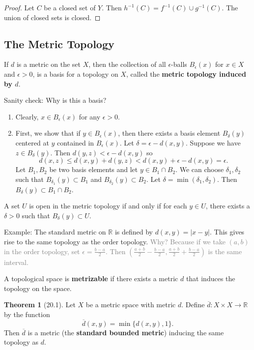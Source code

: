 \documentclass{article}
\newcommand{\nline}{\vspace*{0.5\baselineskip}}
\newcommand{\com}[1]{\textcolor{grey}{#1}}
\theoremstyle{definition}
\newtheorem{theorem}{Theorem}[subsection]
\begin{document}
\begin{flushleft}
\begin{proof}
Let $C$ be a closed set of $Y$. Then $h^{-1}(C) = f^{-1}(C) \cup g^{-1}(C)$. The union of closed sets is closed.
\end{proof}

\subsection{The Metric Topology}

If $d$ is a metric on the set $X$, then the collection of all $\epsilon$-balls $B_\epsilon(x)$ for $x \in X$ and $\epsilon > 0$, is a basis for a topology on $X$, called the \textbf{metric topology induced by $d$}.

\nline

Sanity check: Why is this a basis?

\begin{enumerate}
    \item Clearly, $x \in B_\epsilon(x)$ for any $\epsilon > 0$.
    \item First, we show that if $y \in B_\epsilon(x)$, then there exists a basis element $B_\delta(y)$ centered at $y$ contained in $B_\epsilon(x)$. Let $\delta = \epsilon - d(x,y)$. Suppose we have $z \in B_\delta(y)$. Then $d(y,z) < \epsilon - d(x,y)$ so
    \[
    d(x,z) \leq d(x,y) + d(y,z) < d(x,y) + \epsilon - d(x,y) = \epsilon.
    \]
    Let $B_1, B_2$ be two basis elements and let $y \in B_1 \cap B_2$. We can choose $\delta_1,\delta_2$ such that $B_{\delta_1}(y) \subset B_1$ and $B_{\delta_2}(y) \subset B_2$. Let $\delta = \min(\delta_1,\delta_2)$. Then $B_\delta(y) \subset B_1 \cap B_2$.
\end{enumerate}

A set $U$ is open in the metric topology if and only if for each $y \in U$, there exists a $\delta > 0$ such that $B_\delta(y) \subset U$.

Example: The standard metric on $\mathbb{R}$ is defined by $d(x,y) = |x - y|$. This gives rise to the same topology as the order topology. \com{Why? Because if we take $(a,b)$ in the order topology, set $\epsilon = \frac{b-a}{2}$. Then $(\frac{a+b}{2} - \frac{b - a}{2}, \frac{a+b}{2} + \frac{b - a}{2})$ is the same interval.}

\nline

A topological space is \textbf{metrizable} if there exists a metric $d$ that induces the topology on the space.

\nline

\begin{theorem}[20.1]
Let $X$ be a metric space with metric $d$. Define $\overline{d}: X \times X \to \mathbb{R}$ by the function
\[
\overline{d}(x,y) = \min\{d(x,y), 1\}.
\]
Then $\overline{d}$ is a metric (the \textbf{standard bounded metric}) inducing the same topology as $d$.
\end{theorem}


\end{flushleft}
\end{document}
